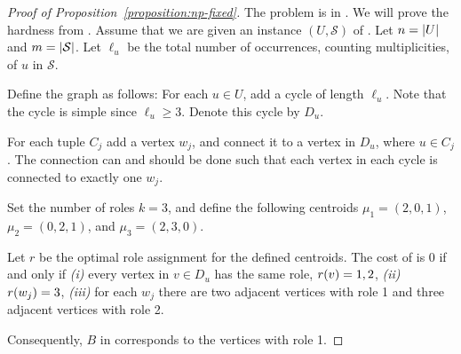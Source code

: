 \begin{proof}[Proof of Proposition~\ref{proposition:np-fixed}]
The problem is in \np.  We will prove the hardness from \tuples.
Assume that we are given an instance $(U, \mathcal{S})$ of \tuples.
Let $n = {\left|U\right|}$ and $m = {\left|\mathcal{S}\right|}$.
Let $\ell_u$ be the total number of occurrences, counting multiplicities,
of $u$ in $\mathcal{S}$.

Define the graph as follows:
For each $u \in U$, add a cycle of length $\ell_u$. Note that the cycle is simple
since $\ell_u \geq 3$. Denote this cycle by $D_u$.

For each tuple $C_j$ add a vertex $w_j$, and connect it to 
a vertex in $D_u$, where $u \in C_j$. The connection can and should be done such
that each vertex in each cycle is connected to exactly one $w_j$.

Set the number of roles $k = 3$, and define the following centroids $\mu_1 = (2, 0, 1)$, $\mu_2 = (0, 2, 1)$,
and $\mu_3 = (2, 3, 0)$.

Let $r$ be the optimal role assignment for the defined centroids.
The cost of is 0 if and only if
\emph{(i)} every vertex in $v \in D_u$ has the same role, $r(v) = 1, 2$,
\emph{(ii)} $r(w_j) = 3$,
\emph{(iii)} for each $w_j$ there are two adjacent vertices with role 1
and three adjacent vertices with role 2.

Consequently, $B$ in \tuples corresponds to the vertices with role 1.
\end{proof}
